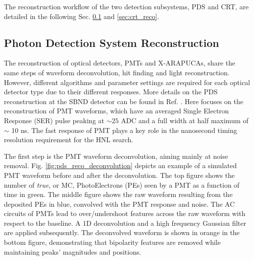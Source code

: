 The reconstruction workflow of the two detection subsystems, PDS and CRT, are detailed in the following Sec. \ref{sec:reco_pds} and \ref{sec:crt_reco}. 

\subsection{Photon Detection System Reconstruction}
\label{sec:reco_pds}

The reconstruction of optical detectors, PMTs and X-ARAPUCAs, share the same steps of waveform deconvolution, hit finding and light reconstruction.
However, different algorithms and parameter settings are required for each optical detector type due to their different responses.
More details on the PDS reconstruction at the SBND detector can be found in Ref. \cite{sbnd_pds_paper}.
Here focuses on the reconstruction of PMT waveforms, which have an averaged Single Electron Response (SER) pulse peaking at $\sim 25$ ADC and a full width at half maximum of $\sim$ 10 ns.
The fast response of PMT plays a key role in the nanosecond timing resolution requirement for the HNL search.

The first step is the PMT waveform deconvolution, aiming mainly at noise removal.%
Fig. \ref{fig:pds_reco_deconvolution} depicts an example of a simulated PMT waveform before and after the deconvolution.
The top figure shows the number of \textit{true}, or MC, PhotoElectrons (PEs) seen by a PMT as a function of time in green.
The middle figure shows the raw waveform resulting from the deposited PEs in blue, convolved with the PMT response and noise.
The AC circuits of PMTs lead to over/undershoot features across the raw waveform with respect to the baseline.
A 1D deconvolution and a high frequency Gaussian filter are applied subsequently.
The deconvolved waveform is shown in orange in the bottom figure, demonstrating that bipolarity features are removed while maintaining peaks' magnitudes and positions.

